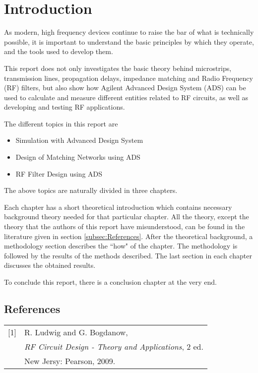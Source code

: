 \documentclass[report.tex]{subfiles}
\begin{document}
\pagebreak \section{Introduction}
As modern, high frequency devices continue to raise the bar of what is technically possible, it is important to understand the basic principles by which they operate, and the tools used to develop them. 

This report does not only investigates the basic theory behind microstrips, transmission lines, propagation delays, impedance matching and Radio Frequency (RF) filters, but also show how Agilent Advanced Design System (ADS) can be used to calculate and measure different entities related to RF circuits, as well as developing and testing RF applications.

The different topics in this report are
\begin{itemize}
\item Simulation with Advanced Design System
\item Design of Matching Networks using ADS
\item RF Filter Design using ADS
\end{itemize}
The above topics are naturally divided in three chapters.

Each chapter has a short theoretical introduction which contains necessary background theory needed for that particular chapter. All the theory, except the theory that the authors of this report have misunderstood, can be found in the literature given in section \ref{subsec:References}.
After the theoretical background, a methodology section describes the ``how" of the chapter.
The methodology is followed by the results of the methods described.
The last section in each chapter discusses the obtained results.

To conclude this report, there is a conclusion chapter at the very end.

\subsection*{References}\label{subsec:References}
\begin{table}[H]
	\begin{tabular}{l l}
		[1] & R. Ludwig and G. Bogdanow, \\
		& \textit{RF Circuit Design - Theory and Applications}, 2 ed. \\
		& New Jersy: Pearson, 2009.
	\end{tabular}
\end{table}
\end{document}
